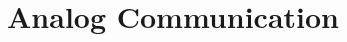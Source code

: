 \documentclass[../course]{subfiles}
\begin{document}
\chapter{Analog Communication}








\end{document}
